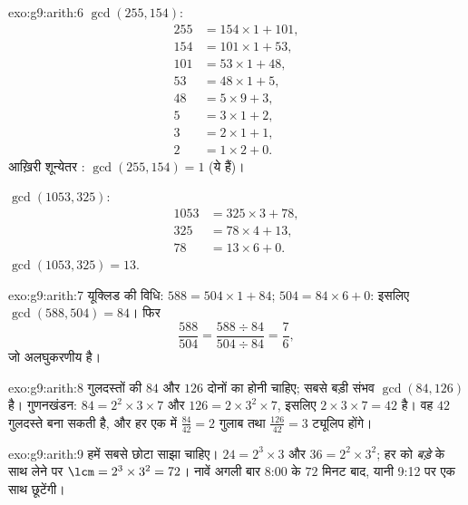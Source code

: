 \begin{solution}{exo:g9:arith:6}
$\gcd(255, 154)$:
\begin{align*}
255 &= 154 \times 1 + 101, \\
154 &= 101 \times 1 + 53, \\
101 &= 53 \times 1 + 48, \\
53 &= 48 \times 1 + 5, \\
48 &= 5 \times 9 + 3, \\
5 &= 3 \times 1 + 2, \\
3 &= 2 \times 1 + 1, \\
2 &= 1 \times 2 + 0 .
\end{align*}
आख़िरी शून्येतर : $\gcd(255, 154) = 1$ (ये  हैं)।

$\gcd(1053, 325)$:
\begin{align*}
1053 &= 325 \times 3 + 78, \\
325 &= 78 \times 4 + 13, \\
78 &= 13 \times 6 + 0 .
\end{align*}
$\gcd(1053, 325) = 13$.
\end{solution}

\begin{solution}{exo:g9:arith:7}
यूक्लिड की विधि: $588 = 504 \times 1 + 84$; $504 = 84 \times 6 + 0$:
इसलिए $\gcd(588, 504) = 84$। फिर
\[
\frac{588}{504} = \frac{588 \div 84}{504 \div 84} = \frac{7}{6},
\]
जो अलघुकरणीय है।
\end{solution}

\begin{solution}{exo:g9:arith:8}
गुलदस्तों की  $84$ और $126$ दोनों का  होनी चाहिए; सबसे बड़ी
संभव  $\gcd(84, 126)$ है। गुणनखंडन: $84 = 2^2 \times 3 \times 7$
और $126 = 2 \times 3^2 \times 7$, इसलिए 
$2 \times 3 \times 7 = 42$ है। वह $42$ गुलदस्ते बना सकती है, और हर एक
में $\frac{84}{42} = 2$ गुलाब तथा $\frac{126}{42} = 3$ ट्यूलिप होंगे।
\end{solution}

\begin{solution}{exo:g9:arith:9}
हमें सबसे छोटा साझा  चाहिए। $24 = 2^3 \times 3$ और
$36 = 2^2 \times 3^2$; हर  को \emph{बड़े}  के साथ
लेने पर $\lcm = 2^3 \times 3^2 = 72$। नावें अगली बार 8:00 के $72$
मिनट बाद, यानी 9:12 पर एक साथ छूटेंगी।
\end{solution}

